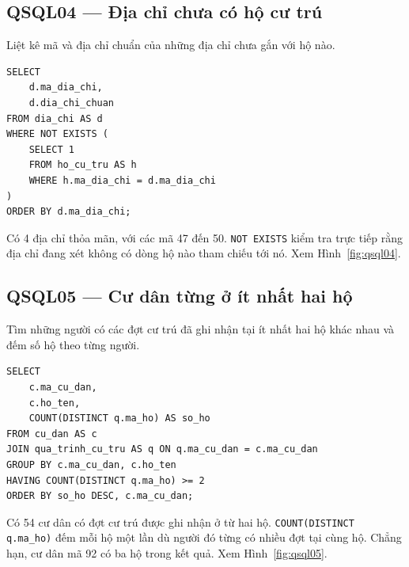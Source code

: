 \noindent\begin{minipage}{\linewidth}
\subsection*{QSQL04 --- Địa chỉ chưa có hộ cư trú}

Liệt kê mã và địa chỉ chuẩn của những địa chỉ chưa gắn với hộ nào.

\begin{lstlisting}[style=sqlvn]
SELECT
    d.ma_dia_chi,
    d.dia_chi_chuan
FROM dia_chi AS d
WHERE NOT EXISTS (
    SELECT 1
    FROM ho_cu_tru AS h
    WHERE h.ma_dia_chi = d.ma_dia_chi
)
ORDER BY d.ma_dia_chi;
\end{lstlisting}

Có 4 địa chỉ thỏa mãn, với các mã 47 đến 50. \texttt{NOT EXISTS} kiểm tra trực tiếp rằng địa chỉ đang xét không có dòng hộ nào tham chiếu tới nó. Xem Hình~\ref{fig:qsql04}.
\end{minipage}\par\medskip

\noindent\begin{minipage}{\linewidth}
\subsection*{QSQL05 --- Cư dân từng ở ít nhất hai hộ}

Tìm những người có các đợt cư trú đã ghi nhận tại ít nhất hai hộ khác nhau và đếm số hộ theo từng người.

\begin{lstlisting}[style=sqlvn]
SELECT
    c.ma_cu_dan,
    c.ho_ten,
    COUNT(DISTINCT q.ma_ho) AS so_ho
FROM cu_dan AS c
JOIN qua_trinh_cu_tru AS q ON q.ma_cu_dan = c.ma_cu_dan
GROUP BY c.ma_cu_dan, c.ho_ten
HAVING COUNT(DISTINCT q.ma_ho) >= 2
ORDER BY so_ho DESC, c.ma_cu_dan;
\end{lstlisting}

Có 54 cư dân có đợt cư trú được ghi nhận ở từ hai hộ. \texttt{COUNT(DISTINCT q.ma\_ho)} đếm mỗi hộ một lần dù người đó từng có nhiều đợt tại cùng hộ. Chẳng hạn, cư dân mã 92 có ba hộ trong kết quả. Xem Hình~\ref{fig:qsql05}.
\end{minipage}\par\medskip

